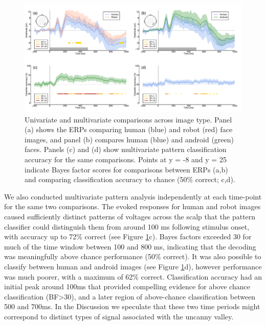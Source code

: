 \documentclass[
]{article}
\begin{document}
\begin{figure}

{\centering \includegraphics{Figures/RobotsMVPA} 

}

\caption{Univariate and multivariate comparisons across image type. Panel (a) shows the ERPs comparing human (blue) and robot (red) face images, and panel (b) compares human (blue) and android (green) faces. Panels (c) and (d) show multivariate pattern classification accuracy for the same comparisons. Points at y = -8 and y = 25 indicate Bayes factor scores for comparisons between ERPs (a,b) and comparing classification accuracy to chance (50\% correct; c,d).}\label{fig:RobotsMVPA}
\end{figure}

We also conducted multivariate pattern analysis independently at each time-point for the same two comparisons. The evoked responses for human and robot images caused sufficiently distinct patterns of voltages across the scalp that the pattern classifier could distinguish them from around 100 ms following stimulus onset, with accuracy up to 72\% correct (see Figure \ref{fig:RobotsMVPA}c). Bayes factors exceeded 30 for much of the time window between 100 and 800 ms, indicating that the decoding was meaningfully above chance performance (50\% correct). It was also possible to classify between human and android images (see Figure \ref{fig:RobotsMVPA}d), however performance was much poorer, with a maximum of 62\% correct. Classification accuracy had an initial peak around 100ms that provided compelling evidence for above chance classification (BF\textgreater30), and a later region of above-chance classification between 500 and 700ms. In the Discussion we speculate that these two time periods might correspond to distinct types of signal associated with the uncanny valley.
\end{document}
